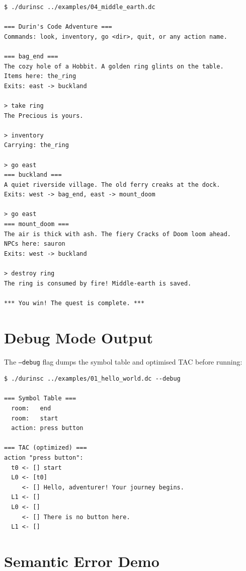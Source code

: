 \documentclass[12pt, a4paper]{article}
\begin{document}
\begin{lstlisting}[style=bash, caption={Full win-path game session}, numbers=none]
$ ./durinsc ../examples/04_middle_earth.dc

=== Durin's Code Adventure ===
Commands: look, inventory, go <dir>, quit, or any action name.

=== bag_end ===
The cozy hole of a Hobbit. A golden ring glints on the table.
Items here: the_ring
Exits: east -> buckland

> take ring
The Precious is yours.

> inventory
Carrying: the_ring

> go east
=== buckland ===
A quiet riverside village. The old ferry creaks at the dock.
Exits: west -> bag_end, east -> mount_doom

> go east
=== mount_doom ===
The air is thick with ash. The fiery Cracks of Doom loom ahead.
NPCs here: sauron
Exits: west -> buckland

> destroy ring
The ring is consumed by fire! Middle-earth is saved.

*** You win! The quest is complete. ***
\end{lstlisting}

\section{Debug Mode Output}

The \texttt{--debug} flag dumps the symbol table and optimised TAC before running:

\begin{lstlisting}[style=bash, caption={Debug mode output for 01\_hello\_world.dc}, numbers=none]
$ ./durinsc ../examples/01_hello_world.dc --debug

=== Symbol Table ===
  room:   end
  room:   start
  action: press button

=== TAC (optimized) ===
action "press button":
  t0 <- [] start
  L0 <- [t0]
     <- [] Hello, adventurer! Your journey begins.
  L1 <- []
  L0 <- []
     <- [] There is no button here.
  L1 <- []
\end{lstlisting}

\section{Semantic Error Demo}
\end{document}

